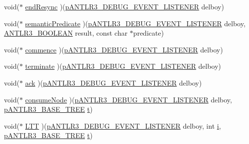 \begin{DoxyCompactItemize}
\item 
void($\ast$ \hyperlink{struct_a_n_t_l_r3___d_e_b_u_g___e_v_e_n_t___l_i_s_t_e_n_e_r__struct_a669726a9950721d30b320cdd534f1589}{end\-Resync} )(\hyperlink{antlr3interfaces_8h_ab226a624395fcc0b8fe2b29ae60b6116}{p\-A\-N\-T\-L\-R3\-\_\-\-D\-E\-B\-U\-G\-\_\-\-E\-V\-E\-N\-T\-\_\-\-L\-I\-S\-T\-E\-N\-E\-R} delboy)
\item 
void($\ast$ \hyperlink{struct_a_n_t_l_r3___d_e_b_u_g___e_v_e_n_t___l_i_s_t_e_n_e_r__struct_ab379ec89e5227d5ee95e0420544f02f7}{semantic\-Predicate} )(\hyperlink{antlr3interfaces_8h_ab226a624395fcc0b8fe2b29ae60b6116}{p\-A\-N\-T\-L\-R3\-\_\-\-D\-E\-B\-U\-G\-\_\-\-E\-V\-E\-N\-T\-\_\-\-L\-I\-S\-T\-E\-N\-E\-R} delboy, \hyperlink{antlr3defs_8h_a5b33dccbba3b7212539695e21df4079b}{A\-N\-T\-L\-R3\-\_\-\-B\-O\-O\-L\-E\-A\-N} result, const char $\ast$predicate)
\item 
void($\ast$ \hyperlink{struct_a_n_t_l_r3___d_e_b_u_g___e_v_e_n_t___l_i_s_t_e_n_e_r__struct_a8f0d972dc2a671daaa530c0929fd2dfc}{commence} )(\hyperlink{antlr3interfaces_8h_ab226a624395fcc0b8fe2b29ae60b6116}{p\-A\-N\-T\-L\-R3\-\_\-\-D\-E\-B\-U\-G\-\_\-\-E\-V\-E\-N\-T\-\_\-\-L\-I\-S\-T\-E\-N\-E\-R} delboy)
\item 
void($\ast$ \hyperlink{struct_a_n_t_l_r3___d_e_b_u_g___e_v_e_n_t___l_i_s_t_e_n_e_r__struct_a61c8813b991db07c7a0dc14be8d9bf96}{terminate} )(\hyperlink{antlr3interfaces_8h_ab226a624395fcc0b8fe2b29ae60b6116}{p\-A\-N\-T\-L\-R3\-\_\-\-D\-E\-B\-U\-G\-\_\-\-E\-V\-E\-N\-T\-\_\-\-L\-I\-S\-T\-E\-N\-E\-R} delboy)
\item 
void($\ast$ \hyperlink{struct_a_n_t_l_r3___d_e_b_u_g___e_v_e_n_t___l_i_s_t_e_n_e_r__struct_af73fc8d7ab547c2769c44fcced3d91f8}{ack} )(\hyperlink{antlr3interfaces_8h_ab226a624395fcc0b8fe2b29ae60b6116}{p\-A\-N\-T\-L\-R3\-\_\-\-D\-E\-B\-U\-G\-\_\-\-E\-V\-E\-N\-T\-\_\-\-L\-I\-S\-T\-E\-N\-E\-R} delboy)
\item 
void($\ast$ \hyperlink{struct_a_n_t_l_r3___d_e_b_u_g___e_v_e_n_t___l_i_s_t_e_n_e_r__struct_ab69667e7adf4eb6f3ada9e47a851402b}{consume\-Node} )(\hyperlink{antlr3interfaces_8h_ab226a624395fcc0b8fe2b29ae60b6116}{p\-A\-N\-T\-L\-R3\-\_\-\-D\-E\-B\-U\-G\-\_\-\-E\-V\-E\-N\-T\-\_\-\-L\-I\-S\-T\-E\-N\-E\-R} delboy, \hyperlink{antlr3interfaces_8h_a6313a8a3e8f044398a393bd10c083852}{p\-A\-N\-T\-L\-R3\-\_\-\-B\-A\-S\-E\-\_\-\-T\-R\-E\-E} \hyperlink{showimage_8m_ad941f6ef920fbfb3d75b60ddbedbdd39}{t})
\item 
void($\ast$ \hyperlink{struct_a_n_t_l_r3___d_e_b_u_g___e_v_e_n_t___l_i_s_t_e_n_e_r__struct_a357f77b7235cc77e2a5128d62f7121eb}{L\-T\-T} )(\hyperlink{antlr3interfaces_8h_ab226a624395fcc0b8fe2b29ae60b6116}{p\-A\-N\-T\-L\-R3\-\_\-\-D\-E\-B\-U\-G\-\_\-\-E\-V\-E\-N\-T\-\_\-\-L\-I\-S\-T\-E\-N\-E\-R} delboy, int \hyperlink{_read_d_m3___matlab_8m_a6f6ccfcf58b31cb6412107d9d5281426}{i}, \hyperlink{antlr3interfaces_8h_a6313a8a3e8f044398a393bd10c083852}{p\-A\-N\-T\-L\-R3\-\_\-\-B\-A\-S\-E\-\_\-\-T\-R\-E\-E} \hyperlink{showimage_8m_ad941f6ef920fbfb3d75b60ddbedbdd39}{t})

\end{DoxyCompactItemize}
